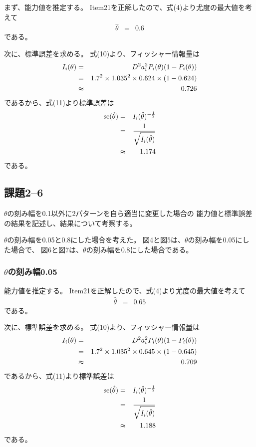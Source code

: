 \documentclass[12pt]{jarticle}
\begin{document}
まず、能力値を推定する。
Item21を正解したので、式(4)より尤度の最大値を考えて
\begin{eqnarray}
    \hat{\theta}&=&0.6 \nonumber
\end{eqnarray}
である。

次に、標準誤差を求める。
式(10)より、フィッシャー情報量は
\begin{eqnarray}
    I_i(\theta)&=&D^2a_i^2 P_i(\theta)(1-P_i(\theta)) \nonumber\\
    &=&1.7^2 \times 1.035^2\times 0.624\times (1-0.624) \nonumber\\
    &\thickapprox& 0.726 \nonumber
\end{eqnarray}
であるから、式(11)より標準誤差は
\begin{eqnarray}
    {\rm se}(\hat{\theta})&=&I_i(\hat{\theta})^{-\frac{1}{2}} \nonumber\\
    &=&\frac{1}{\sqrt{I_i(\hat{\theta})}}\nonumber\\
    &\thickapprox&1.174\nonumber
\end{eqnarray}
である。

\clearpage
\subsection{課題2–6}
\begin{shadebox}
    $\theta$の刻み幅を0.1以外に2パターンを自ら適当に変更した場合の
    能力値と標準誤差の結果を記述し、結果について考察する。
\end{shadebox}

$\theta$の刻み幅を0.05と0.8にした場合を考えた。
図4と図5は、$\theta$の刻み幅を0.05にした場合で、
図6と図7は、$\theta$の刻み幅を0.8にした場合である。


\subsubsection*{$\theta$の刻み幅0.05}
能力値を推定する。
Item21を正解したので、式(4)より尤度の最大値を考えて
\begin{eqnarray}
    \hat{\theta}&=&0.65 \nonumber
\end{eqnarray}
である。

次に、標準誤差を求める。
式(10)より、フィッシャー情報量は
\begin{eqnarray}
    I_i(\theta)&=&D^2a_i^2 P_i(\theta)(1-P_i(\theta)) \nonumber\\
    &=&1.7^2 \times 1.035^2\times 0.645\times (1-0.645) \nonumber\\
    &\thickapprox& 0.709 \nonumber
\end{eqnarray}
であるから、式(11)より標準誤差は
\begin{eqnarray}
    {\rm se}(\hat{\theta})&=&I_i(\hat{\theta})^{-\frac{1}{2}} \nonumber\\
    &=&\frac{1}{\sqrt{I_i(\hat{\theta})}}\nonumber\\
    &\thickapprox&1.188\nonumber
\end{eqnarray}
である。
\end{document}
